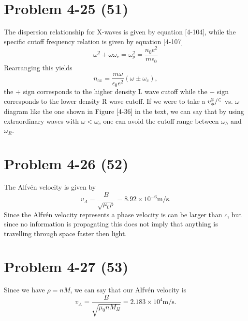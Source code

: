 \section*{Problem 4-25 (51)}
\label{sec:4-25}
The dispersion relationship for X-waves is given by equation [4-104], while the specific cutoff frequency relation is given by equation [4-107]
\begin{equation*}
	\omega^2 \pm \omega\omega_c = \omega_p^2 = \dfrac{n_0e^2}{m\epsilon_0}
\end{equation*}
Rearranging this yields
\begin{equation*}
	n_{cx} = \dfrac{m\omega}{\epsilon_0e^2}(\omega \pm \omega_c),
\end{equation*}
the \(+\) sign corresponds to the higher density L wave cutoff while the \(-\) sign corresponds to the lower density R wave cutoff. If we were to take a \(v^2_\phi/\cal^2 \) vs. \(\omega \) diagram like the one shown in Figure [4-36] in the text, we can say that by using extraordinary waves with \(\omega < \omega_c \) one can avoid the cutoff range between \(\omega_h \) and \(\omega_R \).

\section*{Problem 4-26 (52)}
\label{sec:4-26}
The Alfv\'en velocity is given by
\begin{equation*}
	v_A = \dfrac{B}{\sqrt{\mu_0\rho}} = 8.92 \times 10^{-6}\text{m/s}.
\end{equation*}
Since the Alfv\'en velocity represents a phase velocity is can be larger than \(c\), but since no information is propagating this does not imply that anything is travelling through space faster then light. 

\section*{Problem 4-27 (53)}
\label{sec:4-27}
Since we have \(\rho = nM \), we can say that our Alfv\'en velocity is 
\begin{equation*}
v_A = \dfrac{B}{\sqrt{\mu_0nM_H}} = 2.183 \times 10^{4}\text{m/s}.
\end{equation*}

